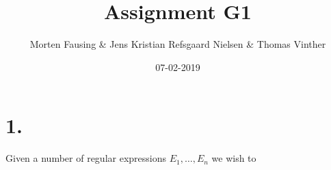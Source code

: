 \documentclass{article}
\theoremstyle{remark}
\numberwithin{equation}{section}
\begin{document}
	\author{Morten Fausing \& Jens Kristian Refsgaard Nielsen \& Thomas Vinther }
	\title{Assignment G1}
	\date{07-02-2019}
	\maketitle
\section*{1.}
Given a number of regular expressions $E_1,\dots,E_n$ we wish to 
\end{document}
